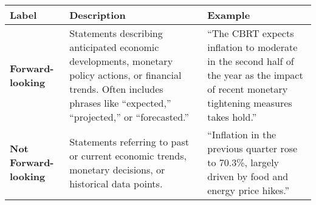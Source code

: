 \begin{table*}
    \caption{}
    \vspace{1em}
    \begin{tabular}{p{}p{}p{}}
    \toprule
    \textbf{Label} & \textbf{Description} & \textbf{Example}\\
    \midrule
    \textbf{Forward-looking} & Statements describing anticipated economic developments, monetary policy actions, or financial trends. Often includes phrases like “expected,” “projected,” or “forecasted.” & “The CBRT expects inflation to moderate in the second half of the year as the impact of recent monetary tightening measures takes hold.” \\
    \midrule
    \textbf{Not Forward-looking} & Statements referring to past or current economic trends, monetary decisions, or historical data points. & “Inflation in the previous quarter rose to 70.3\%, largely driven by food and energy price hikes.” \\
    \bottomrule
    \end{tabular}
    \label{tb:cbrt_forward_looking_guide}
    \end{table*}